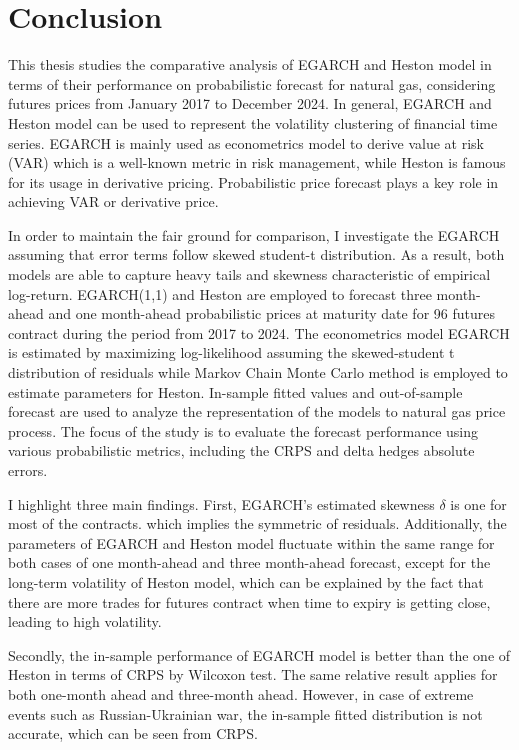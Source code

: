 \documentclass[12pt,a4paper]{article}
\numberwithin{equation}{section}
\begin{document}
\newpage
\section{Conclusion}
This thesis studies the comparative analysis of EGARCH and Heston model in terms of their performance on probabilistic forecast for natural gas, considering futures prices from January 2017 to December 2024. In general, EGARCH and Heston model can be used to represent the volatility clustering of financial time series.  EGARCH is mainly used as econometrics model to derive value at risk (VAR) which is a well-known metric in risk management, while Heston is famous for its usage in derivative pricing. Probabilistic price forecast plays a key role in achieving VAR or derivative price. 

In order to maintain the fair ground for comparison, I investigate the EGARCH assuming that error terms follow skewed student-t distribution. As a result, both models are able to capture heavy tails and skewness characteristic of empirical log-return. EGARCH(1,1) and Heston are employed to forecast three month-ahead and one month-ahead probabilistic prices at maturity date for 96 futures contract during the period from 2017 to 2024. The econometrics model EGARCH is estimated by maximizing log-likelihood assuming the skewed-student t distribution of residuals while Markov Chain Monte Carlo method is employed to estimate parameters for Heston. In-sample fitted values and out-of-sample forecast are used to analyze the representation of the models to natural gas price process. The focus of the study is to evaluate the forecast performance using various probabilistic metrics, including the CRPS and delta hedges absolute errors.

I highlight three main findings. First, EGARCH's estimated skewness $\delta$ is one for most of the contracts. which implies the symmetric of residuals. Additionally, the parameters of EGARCH and Heston model fluctuate within the same range for both cases of one month-ahead and three month-ahead forecast, except for the long-term volatility of Heston model, which can be explained by the fact that there are more trades for futures contract when time to expiry is getting close, leading to high volatility.

Secondly, the in-sample performance of EGARCH model is better than the one of Heston in terms of CRPS by Wilcoxon test. The same relative result applies for both one-month ahead and three-month ahead. However, in case of extreme events such as Russian-Ukrainian war, the in-sample fitted distribution is not accurate, which can be seen from CRPS. 
\end{document}
